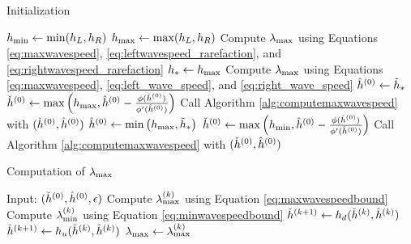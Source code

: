\begin{algorithm}[htb]
\caption{Initialization}
\begin{algorithmic}
\State $h_{\text{min}}\gets \min(h_L,h_R)$
\State $h_{\text{max}}\gets \max(h_L,h_R)$
 
  \State Compute $\lambda_{\text{max}}$ using Equations
    \eqref{eq:maxwavespeed},
    \eqref{eq:leftwavespeed_rarefaction}, and \eqref{eq:rightwavespeed_rarefaction}
  \State \Return
\EndIf
{} 
  \State $h_*\gets h_{\text{max}}$
  \State Compute $\lambda_{\text{max}}$ using Equations
    \eqref{eq:maxwavespeed}, \eqref{eq:left_wave_speed},
    and \eqref{eq:right_wave_speed}
  \State \Return
{} 
  \State $\hat{h}^{(0)}\gets \tilde{h}_*$
  \State $\check{h}^{(0)}\gets \max\left(h_{\text{max}},\hat{h}^{(0)}
    - \frac{\phi(\hat{h}^{(0)})}{\phi'(\hat{h}^{(0)})}\right)$
  \State Call Algorithm \ref{alg:computemaxwavespeed}
    with $(\check{h}^{(0)},\hat{h}^{(0)})$
  \State \Return
\Else {}
  \State $\hat{h}^{(0)}\gets \min\left(h_{\text{max}},\tilde{h}_*\right)$
  \State $\check{h}^{(0)}\gets \max\left(h_{\text{min}},\hat{h}^{(0)}
    - \frac{\phi(\hat{h}^{(0)})}{\phi'(\hat{h}^{(0)})}\right)$
  \State Call Algorithm \ref{alg:computemaxwavespeed}
    with $(\check{h}^{(0)},\hat{h}^{(0)})$
  \State \Return
\EndIf
\end{algorithmic}
\end{algorithm}

\begin{algorithm}[htb]
\caption{Computation of $\lambda_{\text{max}}$}
\label{alg:computemaxwavespeed}
\begin{algorithmic}
\State Input: $(\check{h}^{(0)},\hat{h}^{(0)},\epsilon)$
\Loop
  \State Compute $\lambda_{\text{max}}^{(k)}$ using Equation \eqref{eq:maxwavespeedbound}
  \State Compute $\lambda_{\text{min}}^{(k)}$ using Equation \eqref{eq:minwavespeedbound}
      \State \Return
    \EndIf
  \EndIf
    \State \Return
  \EndIf
  \State $\check{h}^{(k+1)}\gets h_d(\check{h}^{(k)},\hat{h}^{(k)})$
  \State $\hat{h}^{(k+1)}\gets h_u(\check{h}^{(k)},\hat{h}^{(k)})$
\EndLoop
\State $\lambda_{\text{max}}\gets \lambda_{\text{max}}^{(k)}$
\end{algorithmic}
\end{algorithm}

